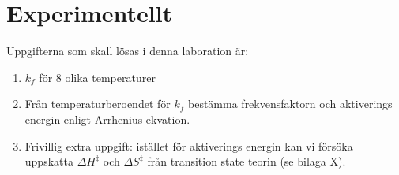 \section{Experimentellt}
\label{sec:exper}
Uppgifterna som skall lösas i denna laboration är:
\begin{enumerate}
\item $k_f$ för 8 olika temperaturer
\item Från temperaturberoendet för $k_f$ bestämma frekvensfaktorn och
  aktiverings energin enligt Arrhenius ekvation.
\item Frivillig extra uppgift: istället för aktiverings energin kan vi försöka 
  uppskatta $\Delta H^{\ddag}$ och $\Delta S^{\ddag}$ från transition state teorin
  (se bilaga X).
\end{enumerate}

